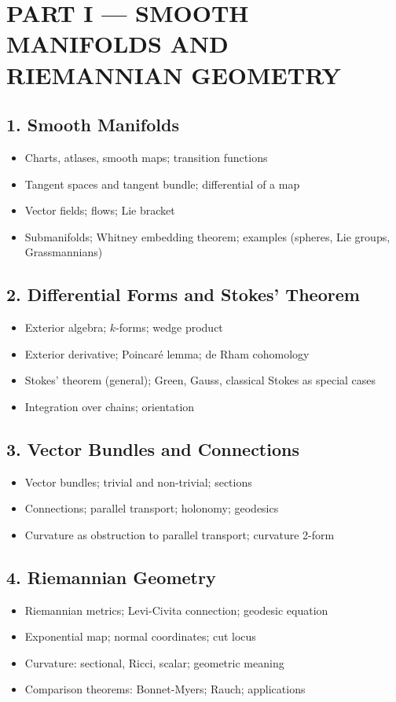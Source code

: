 \section{PART I --- SMOOTH MANIFOLDS AND RIEMANNIAN GEOMETRY}

\subsection{1. Smooth Manifolds}
\begin{itemize}
\item Charts, atlases, smooth maps; transition functions
\item Tangent spaces and tangent bundle; differential of a map
\item Vector fields; flows; Lie bracket
\item Submanifolds; Whitney embedding theorem; examples (spheres, Lie groups, Grassmannians)
\end{itemize}

\subsection{2. Differential Forms and Stokes' Theorem}
\begin{itemize}
\item Exterior algebra; $k$-forms; wedge product
\item Exterior derivative; Poincar\'e lemma; de Rham cohomology
\item Stokes' theorem (general); Green, Gauss, classical Stokes as special cases
\item Integration over chains; orientation
\end{itemize}

\subsection{3. Vector Bundles and Connections}
\begin{itemize}
\item Vector bundles; trivial and non-trivial; sections
\item Connections; parallel transport; holonomy; geodesics
\item Curvature as obstruction to parallel transport; curvature 2-form
\end{itemize}

\subsection{4. Riemannian Geometry}
\begin{itemize}
\item Riemannian metrics; Levi-Civita connection; geodesic equation
\item Exponential map; normal coordinates; cut locus
\item Curvature: sectional, Ricci, scalar; geometric meaning
\item Comparison theorems: Bonnet-Myers; Rauch; applications
\end{itemize}


